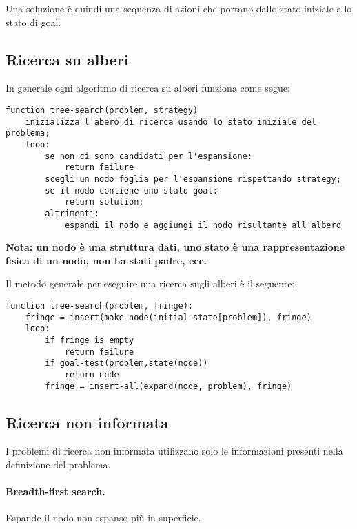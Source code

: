 \documentclass[a4paper, 11pt]{article}
\begin{document}
Una soluzione è quindi una sequenza di azioni che portano dallo stato iniziale allo stato di goal.

\subsection{Ricerca su alberi}
In generale ogni algoritmo di ricerca su alberi funziona come segue:
	\begin{lstlisting}
function tree-search(problem, strategy)
	inizializza l'abero di ricerca usando lo stato iniziale del problema;
	loop:
		se non ci sono candidati per l'espansione:
			return failure
		scegli un nodo foglia per l'espansione rispettando strategy;
		se il nodo contiene uno stato goal:
			return solution;
		altrimenti:
			espandi il nodo e aggiungi il nodo risultante all'albero
	\end{lstlisting}
	
\noindent
\textbf{Nota: un nodo è una struttura dati, uno stato è una rappresentazione fisica di un nodo, non ha stati padre, ecc.}

Il metodo generale per eseguire una ricerca sugli alberi è il seguente:
\begin{lstlisting}
function tree-search(problem, fringe):
	fringe = insert(make-node(initial-state[problem]), fringe) 
	loop:
		if fringe is empty
			return failure
		if goal-test(problem,state(node))
			return node
		fringe = insert-all(expand(node, problem), fringe)
\end{lstlisting}


\subsection{Ricerca non informata}
I problemi di ricerca non informata utilizzano solo le informazioni presenti nella definizione del problema. 
\paragraph{Breadth-first search.} Espande il nodo non espanso più in superficie.
\end{document}
